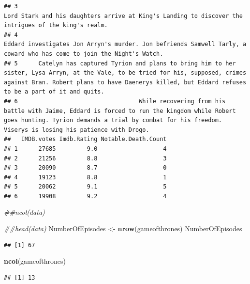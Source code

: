 \documentclass[]{article}
\newenvironment{Shaded}{\begin{snugshade}}{\end{snugshade}}
\newcommand{\CommentTok}[1]{\textcolor[rgb]{0.56,0.35,0.01}{\textit{#1}}}
\newcommand{\KeywordTok}[1]{\textcolor[rgb]{0.13,0.29,0.53}{\textbf{#1}}}
\newcommand{\NormalTok}[1]{#1}
\newcommand{\StringTok}[1]{\textcolor[rgb]{0.31,0.60,0.02}{#1}}
\begin{document}
\begin{verbatim}
## 3                                                                                                                                       Lord Stark and his daughters arrive at King's Landing to discover the intrigues of the king's realm.
## 4                                                                                                                      Eddard investigates Jon Arryn's murder. Jon befriends Samwell Tarly, a coward who has come to join the Night's Watch.
## 5      Catelyn has captured Tyrion and plans to bring him to her sister, Lysa Arryn, at the Vale, to be tried for his, supposed, crimes against Bran. Robert plans to have Daenerys killed, but Eddard refuses to be a part of it and quits.
## 6                                   While recovering from his battle with Jaime, Eddard is forced to run the kingdom while Robert goes hunting. Tyrion demands a trial by combat for his freedom. Viserys is losing his patience with Drogo.
##   IMDB.votes Imdb.Rating Notable.Death.Count
## 1      27685         9.0                   4
## 2      21256         8.8                   3
## 3      20090         8.7                   0
## 4      19123         8.8                   1
## 5      20062         9.1                   5
## 6      19908         9.2                   4
\end{verbatim}

\begin{Shaded}
\begin{Highlighting}[]
\CommentTok{##ncol(data)}
\end{Highlighting}
\end{Shaded}

\begin{Shaded}
\begin{Highlighting}[]
\CommentTok{##head(data)}
\NormalTok{NumberOfEpisodes <-}\StringTok{ }\KeywordTok{nrow}\NormalTok{(gameofthrones)}
\NormalTok{NumberOfEpisodes}
\end{Highlighting}
\end{Shaded}

\begin{verbatim}
## [1] 67
\end{verbatim}

\begin{Shaded}
\begin{Highlighting}[]
\KeywordTok{ncol}\NormalTok{(gameofthrones)}
\end{Highlighting}
\end{Shaded}

\begin{verbatim}
## [1] 13
\end{verbatim}
\end{document}
